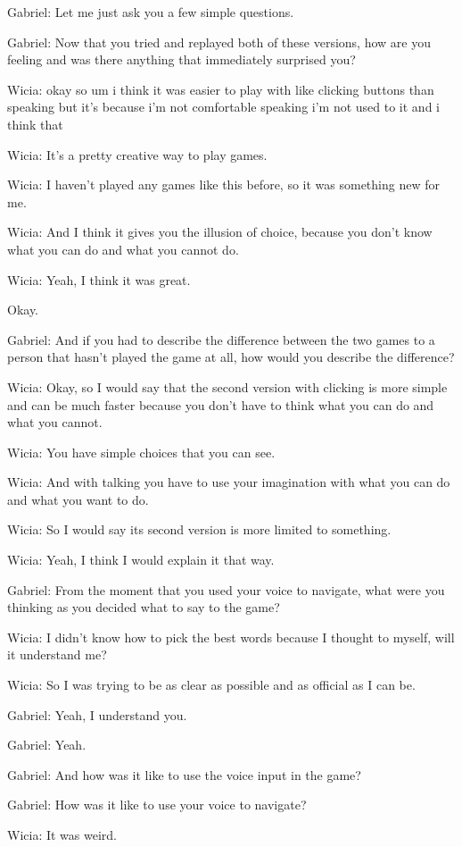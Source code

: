Gabriel: Let me just ask you a few simple questions.

Gabriel: Now that you tried and replayed both of these versions, how are you feeling and was there anything that immediately surprised you?

Wicia: okay so um i think it was easier to play with like clicking buttons than speaking but it's because i'm not comfortable speaking i'm not used to it and i think that

Wicia: It's a pretty creative way to play games.

Wicia: I haven't played any games like this before, so it was something new for me.

Wicia: And I think it gives you the illusion of choice, because you don't know what you can do and what you cannot do.

Wicia: Yeah, I think it was great.

Okay.

Gabriel: And if you had to describe the difference between the two games to a person that hasn't played the game at all, how would you describe the difference?

Wicia: Okay, so I would say that the second version with clicking is more simple and can be much faster because you don't have to think what you can do and what you cannot.

Wicia: You have simple choices that you can see.

Wicia: And with talking you have to use your imagination with what you can do and what you want to do.

Wicia: So I would say its second version is more limited to something.

Wicia: Yeah, I think I would explain it that way.

Gabriel: From the moment that you used your voice to navigate, what were you thinking as you decided what to say to the game?

Wicia: I didn't know how to pick the best words because I thought to myself, will it understand me?

Wicia: So I was trying to be as clear as possible and as official as I can be.

Gabriel: Yeah, I understand you.

Gabriel: Yeah.

Gabriel: And how was it like to use the voice input in the game?

Gabriel: How was it like to use your voice to navigate?

Wicia: It was weird.

